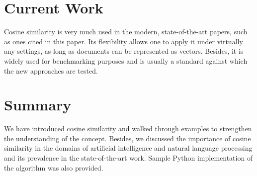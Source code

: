 \documentclass[11pt]{article}
\begin{document}

\section{Current Work}

Cosine similarity is very much used in the modern, state-of-the-art papers,
such as ones cited in this paper. Its flexibility allows one to apply it under
virtually any settings, as long as documents can be represented as vectors.
Besides, it is widely used for benchmarking purposes and is usually a standard
against which the new approaches are tested.


\section{Summary}

We have introduced cosine similarity and walked through examples to strengthen
the understanding of the concept. Besides, we discussed the importance of
cosine similarity in the domains of artificial intelligence and natural
language processing and its prevalence in the state-of-the-art work. Sample
Python implementation of the algorithm was also provided.


\printbibliography[heading=bibintoc]

\end{document}
